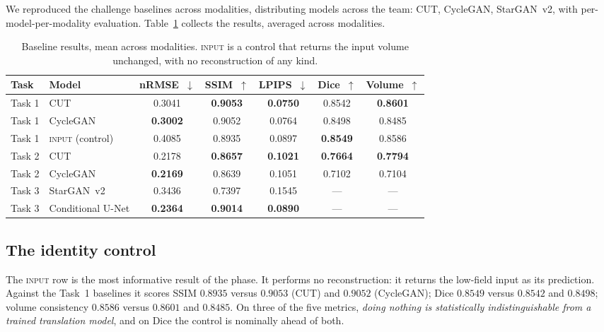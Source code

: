 \documentclass[11pt,a4paper]{article}
\newcommand{\rmse}{nRMSE}
\newcommand{\best}[1]{\textbf{#1}}
\begin{document}
We reproduced the challenge baselines across modalities, distributing models across the team: CUT,
CycleGAN, StarGAN~v2, with per-model-per-modality evaluation. Table~\ref{tab:baselines} collects the
results, averaged across modalities.

\begin{table}[t]
  \centering
  \small
  \caption{Baseline results, mean across modalities. \textsc{input} is a control that returns the
  input volume unchanged, with no reconstruction of any kind.}
  \label{tab:baselines}
  \begin{tabular}{llccccc}
    \toprule
    Task & Model & \rmse{}~$\downarrow$ & SSIM~$\uparrow$ & LPIPS~$\downarrow$ & Dice~$\uparrow$ & Volume~$\uparrow$ \\
    \midrule
    Task 1 & CUT           & 0.3041 & \best{0.9053} & \best{0.0750} & 0.8542 & \best{0.8601} \\
    Task 1 & CycleGAN      & \best{0.3002} & 0.9052 & 0.0764 & 0.8498 & 0.8485 \\
    Task 1 & \textsc{input} (control) & 0.4085 & 0.8935 & 0.0897 & \best{0.8549} & 0.8586 \\
    \midrule
    Task 2 & CUT           & 0.2178 & \best{0.8657} & \best{0.1021} & \best{0.7664} & \best{0.7794} \\
    Task 2 & CycleGAN      & \best{0.2169} & 0.8639 & 0.1051 & 0.7102 & 0.7104 \\
    \midrule
    Task 3 & StarGAN~v2    & 0.3436 & 0.7397 & 0.1545 & --- & --- \\
    Task 3 & Conditional U-Net & \best{0.2364} & \best{0.9014} & \best{0.0890} & --- & --- \\
    \bottomrule
  \end{tabular}
\end{table}

\subsection{The identity control}

The \textsc{input} row is the most informative result of the phase. It performs no reconstruction: it
returns the low-field input as its prediction. Against the Task~1 baselines it scores
SSIM $0.8935$ versus $0.9053$ (CUT) and $0.9052$ (CycleGAN); Dice $0.8549$ versus $0.8542$ and
$0.8498$; volume consistency $0.8586$ versus $0.8601$ and $0.8485$. On three of the five metrics,
\emph{doing nothing is statistically indistinguishable from a trained translation model}, and on Dice
the control is nominally ahead of both.
\end{document}
